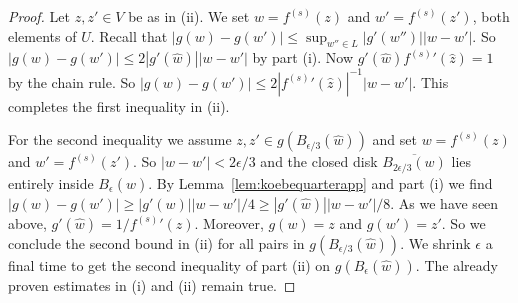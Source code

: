 \documentclass[10pt,a4paper]{amsart}
\begin{document}
\begin{proof}
    Let $z,z'\in V$ be as in (ii).
  We set $w=f^{(s)}(z)$ and $w'=f^{(s)}(z')$, both elements of $U$. 
  Recall that 
  $|g(w)-g(w')|\le  \sup_{w''\in L} |g'(w'')| |w-w'|$.
  So 
  $|g(w)-g(w')|\le 2|g'(\widehat{w})||w-w'|$ by part (i). 
  Now $g'(\widehat{w}){f^{(s)}}'(\widehat z)=1$ by the chain rule. So
  $|g(w)-g(w')|
  \le 2|{f^{(s)}}'(\widehat{z})|^{-1}|w-w'|$. 
  This completes the first inequality in (ii).

  For the second inequality we assume $z,z' \in
  g(B_{\epsilon/3}(\widehat w))$ and set
  $w=f^{(s)}(z)$ and $w'=f^{(s)}(z')$. So $|w-w'|<2\epsilon/3$ and the
  closed disk $\overline{B_{2\epsilon/3}(w)}$ lies entirely inside
  $B_\epsilon(\widehat w)$.
  By Lemma~\ref{lem:koebequarterapp} and part (i) we find
  $|g(w)-g(w')|\ge |g'(w)||w-w'|/4 \ge |g'(\widehat w)| |w-w'|/8$.
  As we have seen above, $g'(\widehat w) =1/{f^{(s)}}'(\widehat
  z)$.  Moreover, $g(w)=z$ and $g(w')=z'$. So
  we conclude the second bound in (ii) for all pairs in
  $g(B_{\epsilon/3}(\widehat w))$. We shrink $\epsilon$ a
  final time to get the second inequality of part (ii)
  on $g(B_\epsilon(\widehat w))$. The
  already proven
  estimates in (i) and (ii) remain true.
\end{proof}
\end{document}
